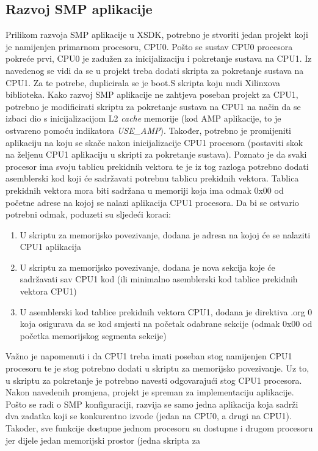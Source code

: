\documentclass[times, utf8, diplomski, numeric]{fer}
\begin{document}
\subsection{Razvoj SMP aplikacije}
Prilikom razvoja SMP aplikacije u XSDK, potrebno je stvoriti jedan projekt koji je namijenjen primarnom procesoru, CPU0.
Pošto se sustav CPU0 procesora pokreće prvi, CPU0 je zadužen za inicijalizaciju i pokretanje sustava na CPU1. Iz navedenog
se vidi da se u projekt treba dodati skripta za pokretanje sustava na CPU1. Za te potrebe, duplicirala se je boot.S skripta
koju nudi Xilinxova biblioteka. Kako razvoj SMP aplikacije ne zahtjeva poseban projekt za CPU1, potrebno je modificirati
skriptu za pokretanje sustava na CPU1 na način da se izbaci dio s inicijalizacijom L2 \textit{cache} memorije (kod AMP
aplikacije, to je ostvareno pomoću indikatora \textit{USE\_AMP}). Također, potrebno je promijeniti aplikaciju na koju se skače
nakon inicijalizacije CPU1 procesora (postaviti skok na željenu CPU1 aplikaciju u skripti za pokretanje sustava).
Poznato je da svaki procesor ima svoju tablicu
prekidnih vektora te je iz tog razloga potrebno dodati asemblerski kod koji će sadržavati potrebnu tablicu prekidnih vektora.
Tablica prekidnih vektora mora biti sadržana u memoriji koja ima odmak 0x00 od početne adrese na kojoj se nalazi
aplikacija CPU1 procesora. Da bi se ostvario potrebni odmak, poduzeti su sljedeći koraci:
\begin{enumerate}
  \item{U skriptu za memorijsko povezivanje, dodana je adresa na kojoj će se nalaziti CPU1 aplikacija}
  \item{U skriptu za memorijsko povezivanje, dodana je nova sekcija koje će sadržavati sav CPU1 kod (ili minimalno asemblerski
  kod tablice prekidnih vektora CPU1)}
  \item{U asemblerski kod tablice prekidnih vektora CPU1, dodana je direktiva .org 0 koja osigurava da se kod smjesti na
  početak odabrane sekcije (odmak 0x00 od početka memorijskog segmenta sekcije)}
\end{enumerate}
Važno je napomenuti i da CPU1 treba imati poseban stog namijenjen CPU1 procesoru te je stog potrebno dodati u skriptu za
memorijsko povezivanje. Uz to, u skriptu za pokretanje je potrebno navesti odgovarajući stog CPU1 procesora.
Nakon navedenih promjena, projekt je spreman za implementaciju aplikacije. Pošto se radi o SMP konfiguraciji, razvija se
samo jedna aplikacija koja sadrži dva zadatka koji se konkurentno izvode (jedan na CPU0, a drugi na CPU1). Također, sve
funkcije dostupne jednom procesoru su dostupne i drugom procesoru jer dijele jedan memorijski prostor (jedna skripta za
\end{document}
